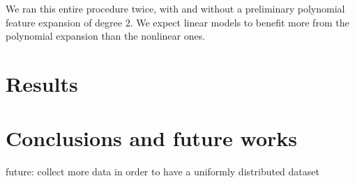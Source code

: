 We ran this entire procedure twice, with and without a preliminary polynomial feature expansion of degree $2$. We expect linear models to benefit more from the polynomial expansion than the nonlinear ones.



\section{Results} \label{sec:frassoni_results}





\section{Conclusions and future works} \label{sec:frassoni_conclusions}

future: collect more data in order to have a uniformly distributed dataset

